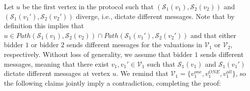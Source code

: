 Let $u$ be the first vertex in the protocol such that 
 $(\mathcal{S}_1(v_1),\mathcal{S}_2(v_2))$ and $(\mathcal{S}_1(v_1'),\mathcal{S}_2(v_2'))$ diverge, i.e., dictate different messages. 
Note that by definition this implies that $u\in Path(\mathcal{S}_1(v_1),\mathcal{S}_2(v_2))\cap Path(\mathcal{S}_1(v_1'),\mathcal{S}_2(v_2'))$ and that either bidder $1$ or bidder $2$ sends different messages for the valuations in $\mathcal{V}_1$ or $\mathcal V_2$, respectively. 
Without loss of generality, we assume that bidder $1$ sends different messages, meaning that there exist $v_1,v_1'\in \mathcal{V}_1$ such that $\mathcal S_1(v_1)$ and $\mathcal S_1(v_1')$ dictate different messages at vertex $u$.  
We remind that $\mathcal{V}_1=\{v_1^{one},v_1^{ONE},v_1^{all}\}$, so the  following claims jointly imply a contradiction, completing the proof: 
 

